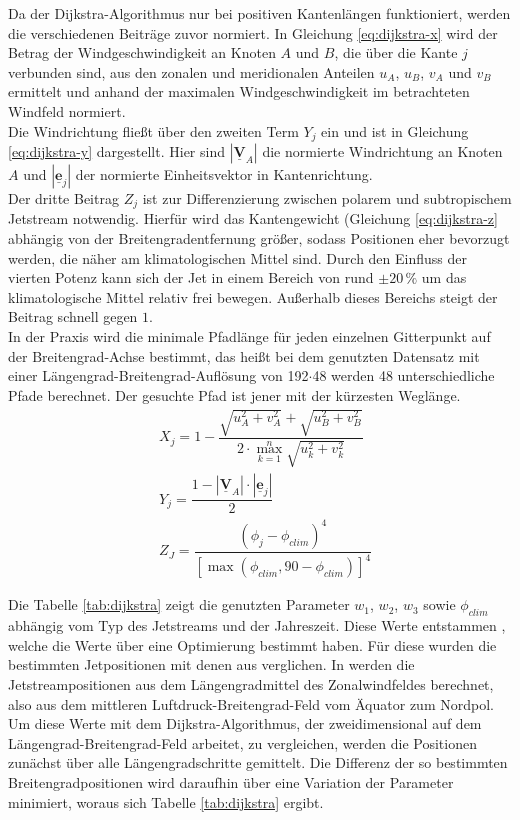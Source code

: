 Da der Dijkstra-Algorithmus nur bei positiven Kantenlängen funktioniert, werden die verschiedenen Beiträge zuvor normiert. In Gleichung \ref{eq:dijkstra-x} wird der Betrag der Windgeschwindigkeit an Knoten $A$ und $B$, die über die Kante $j$ verbunden sind, aus den zonalen und meridionalen Anteilen $u_A$, $u_B$, $v_A$ und $v_B$ ermittelt und anhand der maximalen Windgeschwindigkeit im betrachteten Windfeld normiert.
\\
Die Windrichtung fließt über den zweiten Term $Y_j$ ein und ist in Gleichung \ref{eq:dijkstra-y} dargestellt. Hier sind $|\underline{\boldsymbol{V}}_A|$ die normierte Windrichtung an Knoten $A$ und $|\underline{\boldsymbol{e}}_j|$ der normierte Einheitsvektor in Kantenrichtung.
\\
Der dritte Beitrag $Z_j$ ist zur Differenzierung zwischen polarem und subtropischem Jetstream notwendig. Hierfür wird das Kantengewicht (Gleichung \ref{eq:dijkstra-z} abhängig von der Breitengradentfernung größer, sodass Positionen eher bevorzugt werden, die näher am klimatologischen Mittel sind. Durch den Einfluss der  vierten Potenz kann sich der Jet in einem Bereich von rund $\pm 20\,\%$ um das klimatologische Mittel relativ frei bewegen. Außerhalb dieses Bereichs steigt der Beitrag schnell gegen $1$.
\\
In der Praxis wird die minimale Pfadlänge für jeden einzelnen Gitterpunkt auf der Brei\-ten\-grad-Achse bestimmt, das heißt bei dem genutzten Datensatz mit einer Längengrad-Breitengrad-Auflösung von \num{192}$\cdot$\num{48} werden \num{48} unterschiedliche Pfade berechnet. Der gesuchte Pfad ist jener mit der kürzesten Weglänge.
\begin{align}
  & X_j = 1 - \dfrac{\sqrt{u_A^2 + v_A^2} + \sqrt{u_B^2 + v_B^2}}{2 \cdot \max_{k=1}^n  \sqrt{u_k^2 + v_k^2}}  
  \label{eq:dijkstra-x}\\
  & Y_j = \dfrac{1 - |\underline{\boldsymbol{V}}_A| \cdot |\underline{\boldsymbol{e}}_j|}{2} 
  \label{eq:dijkstra-y}\\
  & Z_J = \dfrac{\left( \phi_j - \phi_{clim} \right)^4}{\left[ \max \left( \phi_{clim}, 90 - \phi_{clim} \right) \right]^4}
  \label{eq:dijkstra-z}
\end{align}

Die Tabelle \ref{tab:dijkstra} zeigt die genutzten Parameter $w_1$, $w_2$, $w_3$ sowie $\phi_{clim}$ abhängig vom Typ des Jetstreams und der Jahreszeit. Diese Werte entstammen \citet{molnos-2017}, welche die Werte über eine Optimierung bestimmt haben. Für diese wurden die bestimmten Jetpositionen mit denen aus \citet{rikus-2015} verglichen. In \citet{rikus-2015} werden die Jetstreampositionen aus dem Längengradmittel des Zonalwindfeldes berechnet, also aus dem mittleren Luftdruck-Breitengrad-Feld vom Äquator zum Nordpol. Um diese Werte mit dem Dijkstra-Algorithmus, der zweidimensional auf dem Längengrad-Breitengrad-Feld arbeitet, zu vergleichen, werden die Positionen zunächst über alle Längengradschritte gemittelt. Die Differenz der so bestimmten Breitengradpositionen wird daraufhin über eine Variation der Parameter minimiert, woraus sich Tabelle \ref{tab:dijkstra} ergibt.

